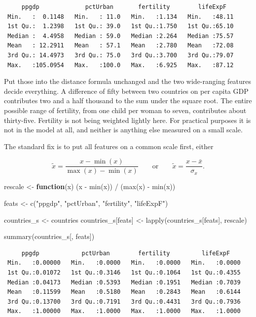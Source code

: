 \documentclass[
  a4paper,
]{scrbook}
\newenvironment{Shaded}{\begin{snugshade}}{\end{snugshade}}
\newcommand{\ControlFlowTok}[1]{\textcolor[rgb]{0.00,0.23,0.31}{\textbf{#1}}}
\newcommand{\FunctionTok}[1]{\textcolor[rgb]{0.28,0.35,0.67}{#1}}
\newcommand{\NormalTok}[1]{\textcolor[rgb]{0.00,0.23,0.31}{#1}}
\newcommand{\OtherTok}[1]{\textcolor[rgb]{0.00,0.23,0.31}{#1}}
\newcommand{\SpecialCharTok}[1]{\textcolor[rgb]{0.37,0.37,0.37}{#1}}
\newcommand{\StringTok}[1]{\textcolor[rgb]{0.13,0.47,0.30}{#1}}
\begin{document}
\begin{verbatim}
     ppgdp             pctUrban       fertility        lifeExpF    
 Min.   :  0.1148   Min.   : 11.0   Min.   :1.134   Min.   :48.11  
 1st Qu.:  1.2398   1st Qu.: 39.0   1st Qu.:1.750   1st Qu.:65.10  
 Median :  4.4958   Median : 59.0   Median :2.264   Median :75.57  
 Mean   : 12.2911   Mean   : 57.1   Mean   :2.780   Mean   :72.08  
 3rd Qu.: 14.4973   3rd Qu.: 75.0   3rd Qu.:3.700   3rd Qu.:79.07  
 Max.   :105.0954   Max.   :100.0   Max.   :6.925   Max.   :87.12  
\end{verbatim}

Put those into the distance formula unchanged and the two wide-ranging
features decide everything. A difference of fifty between two countries
on per capita GDP contributes two and a half thousand to the sum under
the square root. The entire possible range of fertility, from one child
per woman to seven, contributes about thirty-five. Fertility is not
being weighted lightly here. For practical purposes it is not in the
model at all, and neither is anything else measured on a small scale.

The standard fix is to put all features on a common scale first, either

\[\tilde{x} = \frac{x - \min(x)}{\max(x) - \min(x)} \qquad \text{or} \qquad \tilde{x} = \frac{x - \bar{x}}{\sigma_x}.\]

\begin{Shaded}
\begin{Highlighting}[]
\NormalTok{rescale }\OtherTok{\textless{}{-}} \ControlFlowTok{function}\NormalTok{(x) (x }\SpecialCharTok{{-}} \FunctionTok{min}\NormalTok{(x)) }\SpecialCharTok{/}\NormalTok{ (}\FunctionTok{max}\NormalTok{(x) }\SpecialCharTok{{-}} \FunctionTok{min}\NormalTok{(x))}

\NormalTok{feats }\OtherTok{\textless{}{-}} \FunctionTok{c}\NormalTok{(}\StringTok{"ppgdp"}\NormalTok{, }\StringTok{"pctUrban"}\NormalTok{, }\StringTok{"fertility"}\NormalTok{, }\StringTok{"lifeExpF"}\NormalTok{)}

\NormalTok{countries\_s }\OtherTok{\textless{}{-}}\NormalTok{ countries}
\NormalTok{countries\_s[feats] }\OtherTok{\textless{}{-}} \FunctionTok{lapply}\NormalTok{(countries\_s[feats], rescale)}

\FunctionTok{summary}\NormalTok{(countries\_s[, feats])}
\end{Highlighting}
\end{Shaded}

\begin{verbatim}
     ppgdp            pctUrban        fertility         lifeExpF     
 Min.   :0.00000   Min.   :0.0000   Min.   :0.0000   Min.   :0.0000  
 1st Qu.:0.01072   1st Qu.:0.3146   1st Qu.:0.1064   1st Qu.:0.4355  
 Median :0.04173   Median :0.5393   Median :0.1951   Median :0.7039  
 Mean   :0.11599   Mean   :0.5180   Mean   :0.2843   Mean   :0.6144  
 3rd Qu.:0.13700   3rd Qu.:0.7191   3rd Qu.:0.4431   3rd Qu.:0.7936  
 Max.   :1.00000   Max.   :1.0000   Max.   :1.0000   Max.   :1.0000  
\end{verbatim}
\end{document}
